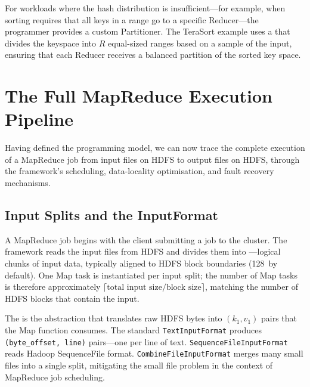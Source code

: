 For workloads where the hash distribution is insufficient---for
example, when sorting requires that all keys in a range go to a
specific Reducer---the programmer provides a custom Partitioner.
The TeraSort example uses a  that
divides the keyspace into $R$ equal-sized ranges based on a sample
of the input, ensuring that each Reducer receives a balanced
partition of the sorted key space.

\section{The Full MapReduce Execution Pipeline}
\label{sec:mr-execution}

Having defined the programming model, we can now trace the complete
execution of a MapReduce job from input files on HDFS to output files
on HDFS, through the framework's scheduling, data-locality optimisation,
and fault recovery mechanisms.

\subsection{Input Splits and the InputFormat}
\label{subsec:input-splits}

A MapReduce job begins with the client submitting a job to the cluster.
The framework reads the input files from HDFS and divides them into
---logical chunks of input data, typically aligned
to HDFS block boundaries (128\MB\ by default). One Map task is
instantiated per input split; the number of Map tasks is therefore
approximately $\lceil \text{total input size} / \text{block size}
\rceil$, matching the number of HDFS blocks that contain the input.

The  is the abstraction that translates raw HDFS
bytes into $(k_1, v_1)$ pairs that the Map function consumes. The
standard \texttt{TextInputFormat} produces \texttt{(byte\_offset, line)}
pairs---one per line of text. \texttt{SequenceFileInputFormat} reads
Hadoop SequenceFile format. \texttt{CombineFileInputFormat} merges
many small files into a single split, mitigating the small file
problem in the context of MapReduce job scheduling.

